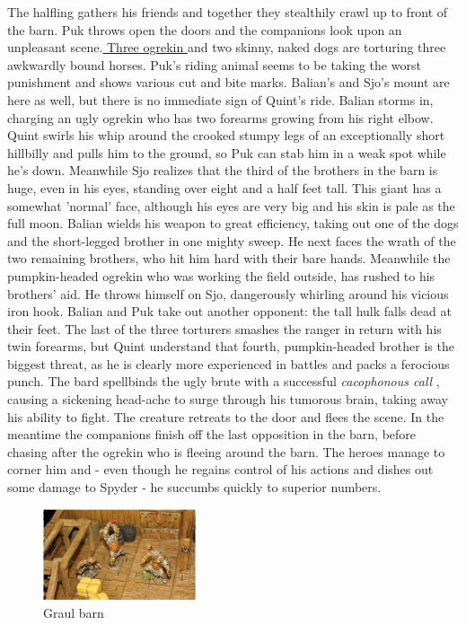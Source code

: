 The halfling gathers his friends and together they stealthily crawl up to front of the barn. Puk throws open the doors and the companions look upon an unpleasant scene.\hyperref[fig:Graul-barn-507694269]{ Three ogrekin } and two skinny, naked dogs are torturing three awkwardly bound horses. Puk's riding animal seems to be taking the worst punishment and shows various cut and bite marks. Balian's and Sjo's mount are here as well, but there is no immediate sign of Quint's ride. Balian storms in, charging an ugly ogrekin who has two forearms growing from his right elbow. Quint swirls his whip around the crooked stumpy legs of an exceptionally short hillbilly and pulls him to the ground, so Puk can stab him in a weak spot while he's down. Meanwhile Sjo realizes that the third of the brothers in the barn is huge, even in his eyes, standing over eight and a half feet tall. This giant has a somewhat 'normal' face, although his eyes are very big and his skin is pale as the full moon. Balian wields his weapon to great efficiency, taking out one of the dogs and the short-legged brother in one mighty sweep. He next faces the wrath of the two remaining brothers, who hit him hard with their bare hands. Meanwhile the pumpkin-headed ogrekin who was working the field outside, has rushed to his brothers' aid. He throws himself on Sjo, dangerously whirling around his vicious iron hook. Balian and Puk take out another opponent: the tall hulk falls dead at their feet. The last of the three torturers smashes the ranger in return with his twin forearms, but Quint understand that fourth, pumpkin-headed brother is the biggest threat, as he is clearly more experienced in battles and packs a ferocious punch. The bard spellbinds the ugly brute with a successful  {\itshape cacophonous call} , causing a sickening head-ache to surge through his tumorous brain, taking away his ability to fight. The creature retreats to the door and flees the scene. In the meantime the companions finish off the last opposition in the barn, before chasing after the ogrekin who is fleeing around the barn. The heroes manage to corner him and - even though he regains control of his actions and dishes out some damage to Spyder - he succumbs quickly to superior numbers. \\

\begin{figure}[h]
	\centering
	\includegraphics[width=0.4\textwidth]{images/Graul-barn-507694269_mod.jpg}
	\caption{Graul barn}
	\label{fig:Graul-barn-507694269}
\end{figure}

